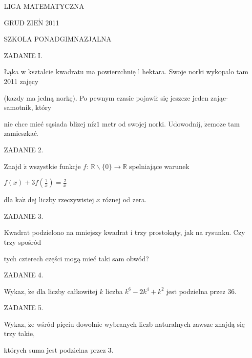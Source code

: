 \documentclass[a4paper,12pt]{article}
\begin{document}
LIGA MATEMATYCZNA

GRUD Z$\mathrm{I}\mathrm{E}\acute{\mathrm{N}}$ 2011

SZKOLA PONADGIMNAZJALNA

ZADANIE I.

Łąka w ksztalcie kwadratu ma powierzchnię l hektara. Swoje norki wykopalo tam 2011 zajęcy

(kazdy ma jedną norkę). Po pewnym czasie pojawił się jeszcze jeden zając- samotnik, który

nie chce mieć sąsiada blizej $\mathrm{n}\mathrm{i}\dot{\mathrm{z}}1$ metr od swojej norki. Udowodnij, $\dot{\mathrm{z}}\mathrm{e}\mathrm{m}\mathrm{o}\dot{\mathrm{z}}\mathrm{e}$ tam zamieszkać.

ZADANIE 2.

Znajd $\acute{\mathrm{z}}$ wszystkie funkcje $f$: $\mathbb{R}\backslash \{0\}\rightarrow \mathbb{R}$ spelniające warunek

$f(x)+3f(\displaystyle \frac{1}{x})=\frac{2}{x}$

dla $\mathrm{k}\mathrm{a}\dot{\mathrm{z}}$ dej liczby rzeczywistej $x$ róznej od zera.

ZADANIE 3.

Kwadrat podzielono na mniejszy kwadrat i trzy prostokąty, jak na rysunku. Czy trzy spośród

tych czterech części mogą mieć taki sam obwód?

ZADANIE 4.

Wykaz, $\dot{\mathrm{z}}\mathrm{e}$ dla liczby całkowitej $k$ liczba $k^{6}-2k^{4}+k^{2}$ jest podzielna przez 36.

ZADANIE 5.

Wykaz, $\dot{\mathrm{z}}\mathrm{e}$ wśród pięciu dowolnie wybranych liczb naturalnych zawsze znajdą się trzy takie,

których suma jest podzielna przez 3.
\end{document}
